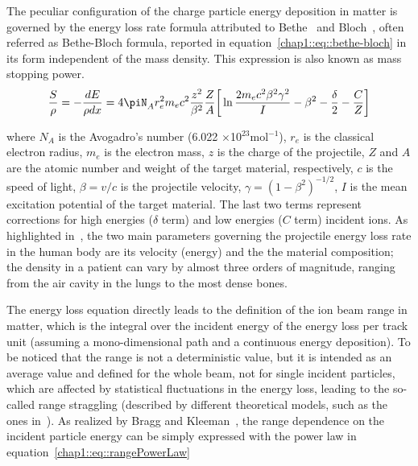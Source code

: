 The peculiar configuration of the charge particle energy deposition in matter is governed by the energy loss rate formula attributed to Bethe~\parencite{Bethe1930} and Bloch~\parencite{Bloch1933}, often referred as Bethe-Bloch formula, reported in equation~\ref{chap1::eq::bethe-bloch} in its form independent of the mass density. This expression is also known as mass stopping power.\\
  
\begin{equation}
\frac{S}{\rho} = -\frac{dE}{\rho dx} = 4\piN_{A}r^{2}_{e}m_{e}c^{2}\frac{z^{2}}{\beta^{2}}\frac{Z}{A}\bigg[\ln{\frac{2m_{e}c^{2}\beta^{2}\gamma^{2}}{I}}-\beta^{2}-\frac{\delta}{2}-\frac{C}{Z}\bigg]
\label{chap1::eq::bethe-bloch}
\end{equation}

where $N_{A}$ is the Avogadro's number (6.022 $\times$10$^{23}$mol$^{-1}$), $r_{e}$ is the classical electron radius, $m_{e}$ is the electron mass, $z$ is the charge of the projectile, $Z$ and $A$ are the atomic number and weight of the target material, respectively, $c$ is the speed of light, $\beta = v/c$ is the projectile velocity, $\gamma = (1-\beta^{2})^{-1/2}$, $I$ is the mean excitation potential of the target material. The last two terms represent corrections for high energies ($\delta$ term) and low energies ($C$ term) incident ions. As highlighted in~\cite{Newhauser2015}, the two main parameters governing the projectile energy loss rate in the human body are its velocity (energy) and the the material composition; the density in a patient can vary by almost three orders of magnitude, ranging from the air cavity in the lungs to the most dense bones. 

The energy loss equation directly leads to the definition of the ion beam range in matter, which is the integral over the incident energy of the energy loss per track unit (assuming a mono-dimensional path and a continuous energy deposition). To be noticed that the range is not a deterministic value, but it is intended as an average value and defined for the whole beam, not for single incident particles, which are affected by statistical fluctuations in the energy loss, leading to the so-called range straggling (described by different theoretical models, such as the ones in~\cite{Bohr1915, Landau1944, Vavilov1957}). As realized by Bragg and Kleeman~\parencite{Bragg1905}, the range dependence on the incident particle energy can be simply expressed with the power law in equation~\ref{chap1::eq::rangePowerLaw}

